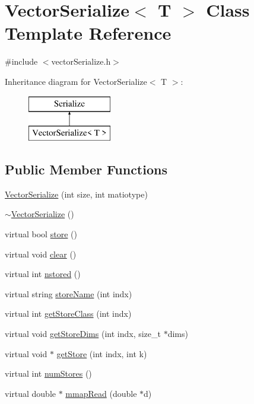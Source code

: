 \hypertarget{classVectorSerialize}{\section{Vector\-Serialize$<$ T $>$ Class Template Reference}
\label{classVectorSerialize}
}


{\ttfamily \#include $<$vector\-Serialize.\-h$>$}

Inheritance diagram for Vector\-Serialize$<$ T $>$\-:\begin{figure}[H]
\begin{center}
\leavevmode
\includegraphics[height=2.000000cm]{classVectorSerialize}
\end{center}
\end{figure}
\subsection*{Public Member Functions}
\begin{DoxyCompactItemize}
\item 
\hyperlink{classVectorSerialize_a60c3584a75eb413096821a82b9c4324f}{Vector\-Serialize} (int size, int matiotype)
\item 
\hyperlink{classVectorSerialize_a34d822f6145f446eb01aae2c1f4634cb}{$\sim$\-Vector\-Serialize} ()
\item 
virtual bool \hyperlink{classVectorSerialize_afd6b6dc8768969dae5f27f46eeab83e6}{store} ()
\item 
virtual void \hyperlink{classVectorSerialize_ae94606fef7aec9ade8142d3cd56449ab}{clear} ()
\item 
virtual int \hyperlink{classVectorSerialize_a97c0db5a4da6c14c9c053092cc89e2bd}{nstored} ()
\item 
virtual string \hyperlink{classVectorSerialize_a929f94f68d0a99c61308520a679ae1a2}{store\-Name} (int indx)
\item 
virtual int \hyperlink{classVectorSerialize_a03d8454fff77942e63cd1764f1013f2d}{get\-Store\-Class} (int indx)
\item 
virtual void \hyperlink{classVectorSerialize_aa22f90d57d8802670716f4b859d6b069}{get\-Store\-Dims} (int indx, size\-\_\-t $\ast$dims)
\item 
virtual void $\ast$ \hyperlink{classVectorSerialize_a08f1412b11fb7b034da21c5ec131489b}{get\-Store} (int indx, int k)
\item 
virtual int \hyperlink{classVectorSerialize_a15226c69bda0fff870f20026f8681d80}{num\-Stores} ()
\item 
virtual double $\ast$ \hyperlink{classVectorSerialize_a087c30b15095d1b230705e42123eb3db}{mmap\-Read} (double $\ast$d)
\end{DoxyCompactItemize}
